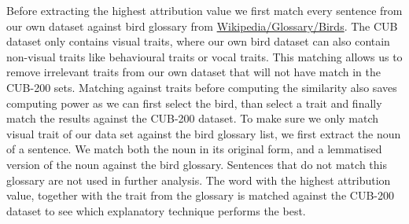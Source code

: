 \documentclass[a4paper, 12pt, oneside]{book} %
\begin{document}

Before extracting the highest attribution value we first match every sentence from our own dataset against bird glossary from \href{https://en.wikipedia.org/wiki/Glossary_of_bird_terms}{Wikipedia/Glossary/Birds}.
The CUB dataset only contains visual traits, where our own bird dataset can also contain non-visual traits like behavioural traits or vocal traits.
This matching allows us to remove irrelevant traits from our own dataset that will not have match in the CUB-200 sets.
Matching against traits before computing the similarity also saves computing power as we can first select the bird, than select a trait and finally match the results against the CUB-200 dataset.
To make sure we only match visual trait of our data set against the bird glossary list, we first extract the noun of a sentence.
We match both the noun in its original form, and a lemmatised version of the noun against the bird glossary.
Sentences that do not match this glossary are not used in further analysis.
The word with the highest attribution value, together with the trait from the glossary is matched against the CUB-200 dataset to see which explanatory technique performs the best.
\end{document}
